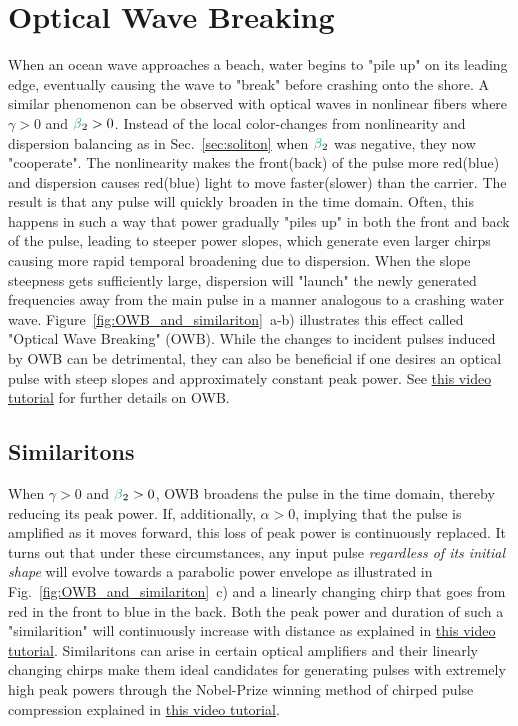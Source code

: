




\section{Optical Wave Breaking}
When an ocean wave approaches a beach, water begins to "pile up" on its leading edge, eventually causing the wave to "break" before crashing onto the shore. A similar phenomenon can be observed with optical waves in nonlinear fibers where $\gamma>0$ and $\betag_2>0$. Instead of the local color-changes from nonlinearity and dispersion balancing as in Sec.~\ref{sec:soliton} when $\betag_2$ was negative, they now "cooperate". The nonlinearity makes the front(back) of the pulse more red(blue) and dispersion causes red(blue) light to move faster(slower) than the carrier. The result is that any pulse will quickly broaden in the time domain. Often, this happens in such a way that power gradually "piles up" in both the front and back of the pulse, leading to steeper power slopes, which generate even larger chirps causing more rapid temporal broadening due to dispersion. When the slope steepness gets sufficiently large, dispersion will "launch" the newly generated frequencies away from the main pulse in a manner analogous to a crashing water wave. Figure~\ref{fig:OWB_and_similariton}~a-b) illustrates this effect called "Optical Wave Breaking" (OWB). While the changes to incident pulses induced by OWB can be detrimental, they can also be beneficial if one desires an optical pulse with steep slopes and approximately constant peak power. See \href{https://youtu.be/XEx6lOf6f40}{this video tutorial} for further details on OWB. 

\subsection{Similaritons}
When $\gamma>0$ and $\betag_2>0$, OWB broadens the pulse in the time domain, thereby reducing its peak power. If, additionally, $\alpha>0$, implying that the pulse is amplified as it moves forward, this loss of peak power is continuously replaced. It turns out that under these circumstances, any input pulse \emph{regardless of its initial shape} will evolve towards a parabolic power envelope as illustrated in Fig.~\ref{fig:OWB_and_similariton}~c) and a linearly changing chirp that goes from red in the front to blue in the back\cite{Similariton_evolution}. Both the peak power and duration of such a "similarition" will continuously increase with distance as explained in \href{https://youtu.be/ZtWIRaj5VV4}{this video tutorial}. Similaritons can arise in certain optical amplifiers and their linearly changing chirps make them ideal candidates for generating pulses with extremely high peak powers through the Nobel-Prize winning method of chirped pulse compression explained in \href{https://youtu.be/Eh5CHRWFT-M}{this video tutorial}.   

